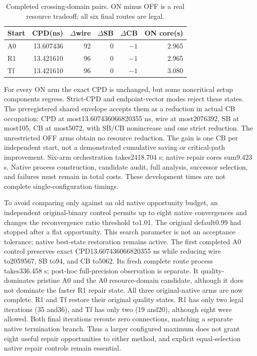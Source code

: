 \begin{table}[t]
\centering\scriptsize
\caption{Completed crossing-domain pairs. ON minus OFF is a real resource tradeoff; all six final routes are legal.}
\begin{tabular}{lrrrrr}
\hline
Start & CPD(ns) & $\Delta$wire & $\Delta$SB & $\Delta$CB & ON core(s)\\
\hline
A0 &13.607436&92&0&$-1$&2.965\\
R1 &13.421610&96&0&$-1$&2.965\\
Tf &13.421610&96&0&$-1$&3.080\\
\hline
\end{tabular}
\end{table}
For every ON arm the exact CPD is unchanged, but some noncritical setup components regress. Strict-CPD and endpoint-vector modes reject these states. The preregistered shared envelope accepts them as a reduction in actual CB occupation: CPD at most13.607436066820355 ns, wire at most2076392, SB at most105, CB at most5072, with SB/CB nonincrease and one strict reduction. The unrestricted OFF arms obtain no resource reduction. The gain is one CB per independent start, not a demonstrated cumulative saving or critical-path improvement. Six-arm orchestration takes2418.704 s; native repair cores sum9.423 s. Native process construction, candidate audit, full analysis, successor selection, and failures must remain in total costs. These development times are not complete single-configuration timings.

To avoid comparing only against an old native opportunity budget, an independent original-binary control permits up to eight native convergences and changes the reconvergence ratio threshold to1.01. The original default0.99 had stopped after a flat opportunity. This search parameter is not an acceptance tolerance; native best-state restoration remains active. The first completed A0 control preserves exact CPD13.607436066820355 ns while reducing wire to2059567, SB to94, and CB to5062. Its fresh complete route process takes336.458 s; post-hoc full-precision observation is separate. It quality-dominates pristine A0 and the A0 resource-domain candidate, although it does not dominate the faster R1 repair state. All three original-native arms are now complete. R1 and Tf restore their original quality states. R1 has only two legal iterations (35 and36), and Tf has only two (19 and20), although eight were allowed. Both final iterations reroute zero connections, matching a separate native termination branch. Thus a larger configured maximum does not grant eight useful repair opportunities to either method, and explicit equal-selection native repair controls remain essential.

